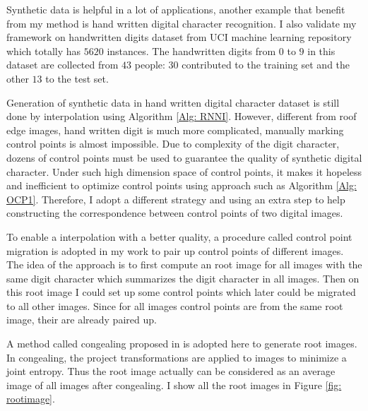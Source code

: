 \documentclass{iitthesis}
\begin{document}
 Synthetic data is helpful in a lot of applications, another example that benefit from my method is hand written digital character recognition. I also validate my framework on handwritten digits dataset from
UCI machine learning repository \cite{Bache+Lichman:2013} which totally has $5620$ instances. The handwritten digits from $0$ to $9$ in this dataset are collected from $43$ people: $30$ contributed to the training set and the other $13$ to the test set. 

Generation of synthetic data in hand written digital character dataset is still done by interpolation using Algorithm \ref{Alg: RNNI}. However, different from roof edge images, hand written digit is much more complicated, manually marking control points is almost impossible. Due to complexity of the digit character, dozens of control points must be used to guarantee the quality of synthetic digital character. Under such high dimension space of control points, it makes it hopeless and inefficient to optimize control points using approach such as Algorithm \ref{Alg: OCP1}. Therefore, I adopt a different strategy and using an extra step to help constructing the correspondence between control points of two digital images. 

To enable a interpolation with a better quality, a procedure called control point migration is adopted in my work to pair up control points of different images. The idea of the approach is to first compute an root image for all images with the same digit character which summarizes the digit character in all images. Then on this root image I could set up some control points which later could be migrated to all other images. Since for all images control points are   from the same root image, their are already paired up. 

A method called congealing proposed in \cite{ME:00} is adopted here to generate root images. In congealing, the project transformations are applied to images to minimize a joint entropy. Thus the root image actually can be considered as an average image of all images after congealing. I show all the root images in Figure \ref{fig: rootimage}.
\end{document}
